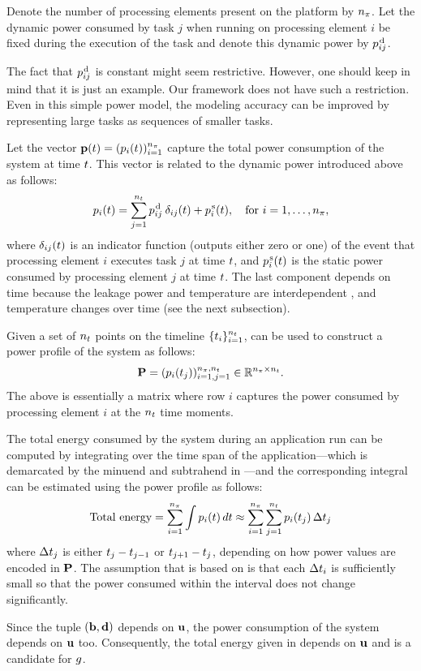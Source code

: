 Denote the number of processing elements present on the platform by ${n_\pi}$. Let
the dynamic power consumed by task $j$ when running on processing element $i$ be
fixed during the execution of the task and denote this dynamic power by
$p^{\text{\kern0.1emd}}_{ij}$.

The fact that $p^{\text{\kern0.1emd}}_{ij}$ is constant might seem restrictive. However,
one should keep in mind that it is just an example. Our framework does not have
such a restriction. Even in this simple power model, the modeling accuracy can
be improved by representing large tasks as sequences of smaller tasks.

Let the vector $\mathbf{p}(t) = (p_i(t))_{i = 1}^{{n_\pi}}$ capture the total power
consumption of the system at time $t$. This vector is related to the dynamic
power introduced above as follows:
\begin{equation} \elab{power}
  \p_i(\t) = \sum_{j = 1}^\nt \p^\dynamic_{ij} \: \delta_{ij} (\t) + \p^\static_i(\t), \hspace{1em} \text{for $i = 1, \dots, \np$},
\end{equation}
where $\delta_{ij}(t)$ is an indicator function (outputs either zero or one) of
the event that processing element $i$ executes task $j$ at time $t$, and
$p^{\text{\kern0.1ems}}_i(t)$ is the static power consumed by processing element $j$ at
time $t$. The last component depends on time because the leakage power and
temperature are interdependent \cite{liu2007}, and temperature changes over time
(see the next subsection).

Given a set of ${n_t}$ points on the timeline $\{ t_i \}_{i = 1}^{n_t}$,
 can be used to construct a power profile of the system as follows:
\[
  \mathbf{P} = (p_i(t_j))_{i = 1, j = 1}^{{n_\pi}, {n_t}} \in \mathbb{R}^{{n_\pi} \times {n_t}}.
\]
The above is essentially a matrix where row $i$ captures the power consumed by
processing element $i$ at the ${n_t}$ time moments.

The total energy consumed by the system during an application run can be
computed by integrating  over the time span of the
application---which is demarcated by the minuend and subtrahend in
---and the corresponding integral can be estimated using
the power profile as follows:
\begin{equation} \elab{total-energy}
  \text{Total energy} = \sum_{i = 1}^\np \int \p_i(\t) \, \d\t \approx \sum_{i = 1}^\np \sum_{j = 1}^\ns \p_i(\t_j) \, \Delta\t_j
\end{equation}
where $\Delta t_j$ is either $t_j - t_{j - 1}$ or $t_{j + 1} - t_j$,
depending on how power values are encoded in $\mathbf{P}$. The assumption that
 is based on is that each $\Delta t_i$ is sufficiently small
so that the power consumed within the interval does not change significantly.

Since the tuple $(\mathbf{b}, \mathbf{d})$ depends on $\mathbf{u}$, the power consumption of the
system depends on $\mathbf{u}$ too. Consequently, the total energy given in
 depends on $\mathbf{u}$ and is a candidate for $g$.
